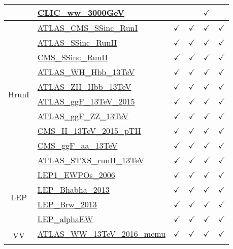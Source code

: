 \documentclass{article}
\begin{document}
\begin{longtable}{|c|l|c|c|c|c|}
 & \href{https://arxiv.org}{CLIC_ww_3000GeV}  &  &  & $\checkmark$ &
\\ \hline
\multirow{10}{*}{HrunI}
 & \href{https://arxiv.org}{ATLAS_CMS_SSinc_RunI}  & $\checkmark$ & $\checkmark$ & $\checkmark$ & $\checkmark$\\ \cline{2-6}
 & \href{https://arxiv.org}{ATLAS_SSinc_RunII}  & $\checkmark$ & $\checkmark$ & $\checkmark$ & $\checkmark$\\ \cline{2-6}
 & \href{https://arxiv.org}{CMS_SSinc_RunII}  & $\checkmark$ & $\checkmark$ & $\checkmark$ & $\checkmark$\\ \cline{2-6}
 & \href{https://arxiv.org}{ATLAS_WH_Hbb_13TeV}  & $\checkmark$ & $\checkmark$ & $\checkmark$ & $\checkmark$\\ \cline{2-6}
 & \href{https://arxiv.org}{ATLAS_ZH_Hbb_13TeV}  & $\checkmark$ & $\checkmark$ & $\checkmark$ & $\checkmark$\\ \cline{2-6}
 & \href{https://arxiv.org}{ATLAS_ggF_13TeV_2015}  & $\checkmark$ & $\checkmark$ & $\checkmark$ & $\checkmark$\\ \cline{2-6}
 & \href{https://arxiv.org}{ATLAS_ggF_ZZ_13TeV}  & $\checkmark$ & $\checkmark$ & $\checkmark$ & $\checkmark$\\ \cline{2-6}
 & \href{https://arxiv.org}{CMS_H_13TeV_2015_pTH}  & $\checkmark$ & $\checkmark$ & $\checkmark$ & $\checkmark$\\ \cline{2-6}
 & \href{https://arxiv.org}{CMS_ggF_aa_13TeV}  & $\checkmark$ & $\checkmark$ & $\checkmark$ & $\checkmark$\\ \cline{2-6}
 & \href{https://arxiv.org}{ATLAS_STXS_runII_13TeV}  & $\checkmark$ & $\checkmark$ & $\checkmark$ & $\checkmark$
\\ \hline
\multirow{4}{*}{LEP}
 & \href{https://arxiv.org}{LEP1_EWPOs_2006}  & $\checkmark$ & $\checkmark$ & $\checkmark$ & $\checkmark$\\ \cline{2-6}
 & \href{https://arxiv.org}{LEP_Bhabha_2013}  & $\checkmark$ & $\checkmark$ & $\checkmark$ & $\checkmark$\\ \cline{2-6}
 & \href{https://arxiv.org}{LEP_Brw_2013}  & $\checkmark$ & $\checkmark$ & $\checkmark$ & $\checkmark$\\ \cline{2-6}
 & \href{https://arxiv.org}{LEP_alphaEW}  & $\checkmark$ & $\checkmark$ & $\checkmark$ & $\checkmark$
\\ \hline
\multirow{8}{*}{VV}
 & \href{https://arxiv.org}{ATLAS_WW_13TeV_2016_memu}  & $\checkmark$ & $\checkmark$ & $\checkmark$ & $\checkmark$\\ \cline{2-6}

\end{longtable}
\end{document}
